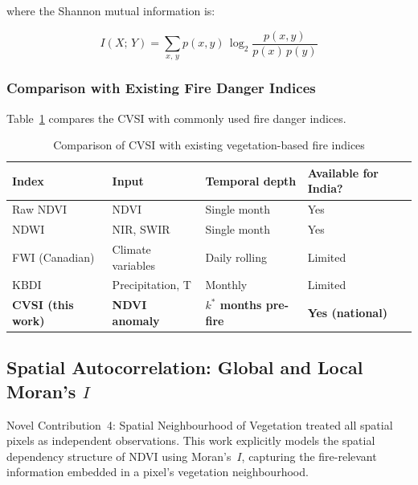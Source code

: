 \documentclass[12pt, a4paper]{article}
\begin{document}
where the Shannon mutual information is:

\begin{equation}
    I(X;\,Y) = \sum_{x,\,y} p(x,y)\,\log_2
    \frac{p(x,y)}{p(x)\,p(y)}
    \label{eq:mutual_info}
\end{equation}

\subsubsection{Comparison with Existing Fire Danger Indices}

Table~\ref{tab:cvsi_comparison} compares the CVSI with commonly used
fire danger indices.

\begin{table}[H]
\centering
\caption{Comparison of CVSI with existing vegetation-based fire indices}
\label{tab:cvsi_comparison}
\begin{tabular}{@{}llll@{}}
\toprule
\textbf{Index} & \textbf{Input} & \textbf{Temporal depth} &
\textbf{Available for India?} \\
\midrule
Raw NDVI \citep{biswas2025}   & NDVI              & Single month      & Yes \\
NDWI                           & NIR, SWIR         & Single month      & Yes \\
FWI (Canadian)                 & Climate variables & Daily rolling     & Limited \\
KBDI                           & Precipitation, T  & Monthly           & Limited \\
\textbf{CVSI (this work)}      & \textbf{NDVI anomaly} &
    \textbf{$k^*$ months pre-fire} & \textbf{Yes (national)} \\
\bottomrule
\end{tabular}
\end{table}

\subsection{Spatial Autocorrelation: Global and Local Moran's $I$}
\label{sec:morans_i}

\begin{novelbox}{Novel Contribution~4: Spatial Neighbourhood of Vegetation}
\citet{biswas2025} treated all spatial pixels as independent
observations. This work explicitly models the spatial dependency
structure of NDVI using Moran's~$I$, capturing the fire-relevant
information embedded in a pixel's vegetation neighbourhood.
\end{novelbox}
\end{document}
